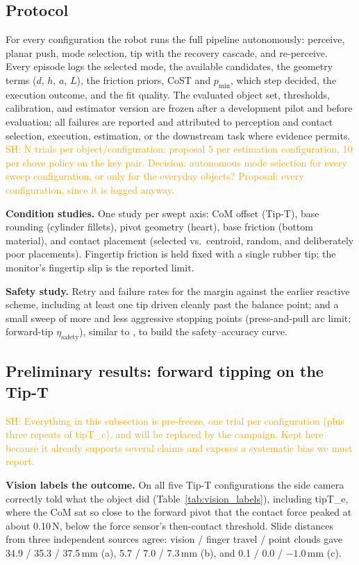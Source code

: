 \documentclass[10pt, conference]{IEEEtran}
\newcommand{\sh}[1]{\textcolor{orange}{SH: #1}}
\newcommand{\iros}{\cite{hyland_before_2026}}
\begin{document}
\subsection{Protocol}
For every configuration the robot runs the full pipeline autonomously: perceive, planar push, mode selection, tip with the recovery cascade, and re-perceive. Every episode logs the selected mode, the available candidates, the geometry terms ($d$, $h$, $a$, $L$), the friction priors, CoST and $p_{\min}$, which step decided, the execution outcome, and the fit quality. The evaluated object set, thresholds, calibration, and estimator version are frozen after a development pilot and before evaluation; all failures are reported and attributed to perception and contact selection, execution, estimation, or the downstream task where evidence permits. \sh{N trials per object/configuration: proposal 5 per estimation configuration, 10 per shove policy on the key pair. Decision: autonomous mode selection for every sweep configuration, or only for the everyday objects? Proposal: every configuration, since it is logged anyway.}

\noindent \textbf{Condition studies.} One study per swept axis: CoM offset (Tip-T), base rounding (cylinder fillets), pivot geometry (heart), base friction (bottom material), and contact placement (selected vs.\ centroid, random, and deliberately poor placements). Fingertip friction is held fixed with a single rubber tip; the monitor's fingertip slip is the reported limit.

\noindent \textbf{Safety study.} Retry and failure rates for the margin against the earlier reactive scheme, including at least one tip driven cleanly past the balance point; and a small sweep of more and less aggressive stopping points (press-and-pull arc limit; forward-tip $\eta_{\mathrm{safety}}$), similar to \iros{}, to build the safety--accuracy curve.

\subsection{Preliminary results: forward tipping on the Tip-T} \label{sec:prelim}
\sh{Everything in this subsection is pre-freeze, one trial per configuration (plus three repeats of tipT\_c), and will be replaced by the campaign. Kept here because it already supports several claims and exposes a systematic bias we must report.}

\noindent \textbf{Vision labels the outcome.} On all five Tip-T configurations the side camera correctly told what the object did (Table~\ref{tab:vision_labels}), including tipT\_e, where the CoM sat so close to the forward pivot that the contact force peaked at about 0.10\,N, below the force sensor's then-contact threshold. Slide distances from three independent sources agree: vision / finger travel / point clouds gave 34.9 / 35.3 / 37.5\,mm (a), 5.7 / 7.0 / 7.3\,mm (b), and 0.1 / 0.0 / $-1.0$\,mm (c).
\end{document}
